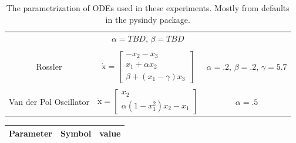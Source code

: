 \documentclass{article}
\renewcommand{\vec}[1]{\boldsymbol{\mathrm{#1}}}
\begin{document}
\begin{table}[ht]
\begin{tabular}{c c c}
            & $\alpha = TBD$, $\beta=TBD $\\\\
        Rossler
            & $\dot {\vec x} = \left[\begin{matrix}
                -x_2 - x_3 \\
                x_1 + \alpha x_2\\
                \beta + (x_1 - \gamma) x_3
            \end{matrix}\right]$
            & $\alpha = .2$, $\beta=.2 $, $\gamma=5.7$\\\\
        Van der Pol Oscillator
            & $\dot {\vec x} = \left[\begin{matrix}
                x_2 \\
                \alpha(1 - x_1^2) x_2 - x_1
            \end{matrix}\right]$
        & $\alpha = .5$
    \end{tabular}
    \caption{The parametrization of ODEs used in these experiments.  Mostly from defaults in the pysindy package.}
\end{table}

\begin{table}
    \label{tab:exp-params}
    \begin{tabular}{c c c}
        Parameter & Symbol & value\\
        \hline
    \end{tabular}
\end{table}



\end{document}
